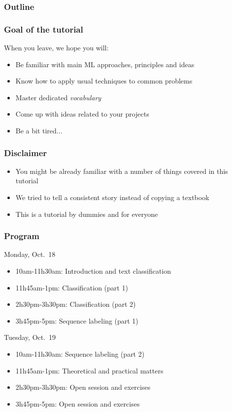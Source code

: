 \documentclass[usenames,dvipsnames]{beamer}
\author[Stroppa and Chrupala]{Grzegorz Chrupa{\l}a and Nicolas Stroppa}
\institute[] %
{
Saarland University\\
Google
}
\date[2010] %
{META Workshop}
\newcommand{\voc}[1]{\emph{\color{ForestGreen}#1}}
\begin{document}
\frame{\titlepage}

\begin{frame}
  \frametitle{Outline}
  \tableofcontents
\end{frame}

\begin{frame}\frametitle{Goal of the tutorial}
   When you leave, we hope you will:
 \begin{itemize}
     \item Be familiar with main ML approaches, principles and ideas
     \item Know how to apply usual techniques to common problems
     \item Master dedicated \voc{vocabulary}
     \item Come up with ideas related to your projects
     \item Be a bit tired...
  \end{itemize}
\end{frame}

\begin{frame}\frametitle{Disclaimer}
\begin{block}{}
\begin{itemize}
  \item You might be already familiar with a number of things covered in this
tutorial
  \item We tried to tell a consistent story instead of copying a textbook
 \item This is a tutorial by dummies and for everyone
\end{itemize}
\end{block}

\end{frame}


\begin{frame}\frametitle{Program}
\begin{block}{Monday, Oct.\ 18}
\begin{itemize}
  \item 10am-11h30am: Introduction and text classification
  \item 11h45am-1pm: Classification (part 1)
  \item 2h30pm-3h30pm: Classification (part 2)
  \item 3h45pm-5pm: Sequence labeling (part 1)
\end{itemize}
\end{block}

\begin{block}{Tuesday, Oct.\ 19}
\begin{itemize}
  \item 10am-11h30am: Sequence labeling (part 2)
  \item 11h45am-1pm: Theoretical and practical matters
  \item 2h30pm-3h30pm: Open session and exercises
  \item 3h45pm-5pm: Open session and exercises
\end{itemize}
\end{block}

\end{frame}
\end{document}
